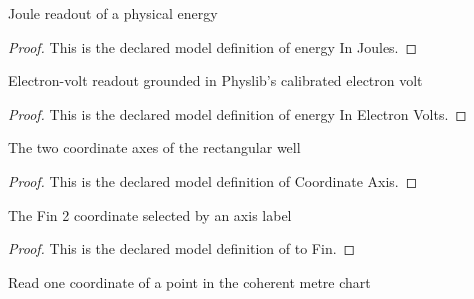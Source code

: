 \begin{definition}
  \label{def:physics:phyx-mini-0584:phyxminiproblems-problemphyxmini0584-energyinjoules}
  Joule readout of a physical energy
\end{definition}
\begin{proof}
  This is the declared model definition of energy In Joules.
\end{proof}
\begin{definition}
  \label{def:physics:phyx-mini-0584:phyxminiproblems-problemphyxmini0584-energyinelectronvolts}
  Electron-volt readout grounded in Physlib's calibrated electron volt
\end{definition}
\begin{proof}
  This is the declared model definition of energy In Electron Volts.
\end{proof}
\begin{definition}
  \label{def:physics:phyx-mini-0584:phyxminiproblems-problemphyxmini0584-coordinateaxis}
  The two coordinate axes of the rectangular well
\end{definition}
\begin{proof}
  This is the declared model definition of Coordinate Axis.
\end{proof}
\begin{definition}[to Fin]
  \label{def:physics:phyx-mini-0584:phyxminiproblems-problemphyxmini0584-coordinateaxis-tofin}
  The Fin 2 coordinate selected by an axis label
\end{definition}
\begin{proof}
  This is the declared model definition of to Fin.
\end{proof}
\begin{definition}
  \label{def:physics:phyx-mini-0584:phyxminiproblems-problemphyxmini0584-coordinateinmeters}
  Read one coordinate of a point in the coherent metre chart
\end{definition}
